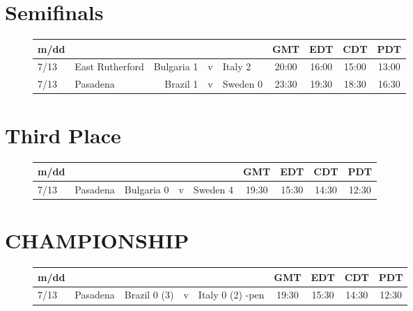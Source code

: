 \section{Semifinals}
\begin{figure}[H]

\begin{tabular}{l l r c l c c c c}
m/dd  & & & & & GMT & EDT & CDT & PDT \\ \hline
7/13 & East Rutherford & Bulgaria 1 & v & Italy 2 & 20:00 &16:00 & 15:00 & 13:00 \\
7/13 & Pasadena & Brazil 1 & v & Sweden 0 & 23:30 & 19:30 & 18:30 & 16:30 \\ \hline
\end{tabular}
\end{figure}

\section{Third Place}
\begin{figure}[H]

\begin{tabular}{l l r c l c c c c}
m/dd  & & & & & GMT & EDT & CDT & PDT \\ \hline
7/13 & Pasadena & Bulgaria 0 & v & Sweden 4 &  19:30 & 15:30 & 14:30 & 12:30\\ \hline
\end{tabular}
\end{figure}

\section{CHAMPIONSHIP}
\begin{figure}[H]
\begin{tabular}{l l r c l c c c c}
m/dd  & & & & & GMT & EDT & CDT & PDT \\ \hline
7/13 & Pasadena & Brazil 0 (3) & v & Italy 0 (2) -pen &  19:30 & 15:30 & 14:30 & 12:30\\ \hline
\end{tabular}
\end{figure}
\normalsize
